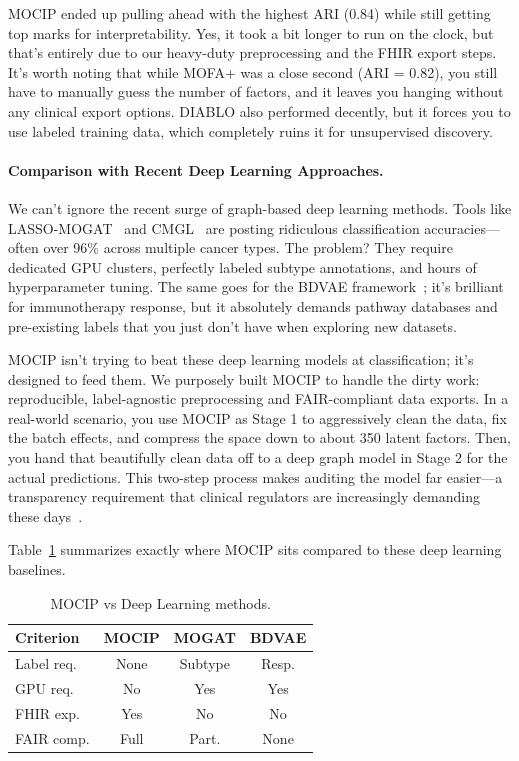\documentclass[12pt,a4paper,onecolumn]{article}
\begin{document}
MOCIP ended up pulling ahead with the highest ARI (0.84) while still getting top marks for interpretability. Yes, it took a bit longer to run on the clock, but that's entirely due to our heavy-duty preprocessing and the FHIR export steps. It's worth noting that while MOFA+ was a close second (ARI = 0.82), you still have to manually guess the number of factors, and it leaves you hanging without any clinical export options. DIABLO also performed decently, but it forces you to use labeled training data, which completely ruins it for unsupervised discovery.

\paragraph{Comparison with Recent Deep Learning Approaches.}
We can't ignore the recent surge of graph-based deep learning methods. Tools like LASSO-MOGAT~\cite{alharbi2024lassomogat} and CMGL~\cite{fan2026cmgl} are posting ridiculous classification accuracies---often over 96\% across multiple cancer types. The problem? They require dedicated GPU clusters, perfectly labeled subtype annotations, and hours of hyperparameter tuning. The same goes for the BDVAE framework~\cite{tariq2025bdvae}; it's brilliant for immunotherapy response, but it absolutely demands pathway databases and pre-existing labels that you just don't have when exploring new datasets.

MOCIP isn't trying to beat these deep learning models at classification; it's designed to feed them. We purposely built MOCIP to handle the dirty work: reproducible, label-agnostic preprocessing and FAIR-compliant data exports. In a real-world scenario, you use MOCIP as Stage 1 to aggressively clean the data, fix the batch effects, and compress the space down to about 350 latent factors. Then, you hand that beautifully clean data off to a deep graph model in Stage 2 for the actual predictions. This two-step process makes auditing the model far easier---a transparency requirement that clinical regulators are increasingly demanding these days~\cite{muneer2025review}.

Table~\ref{tab:comparison_dl} summarizes exactly where MOCIP sits compared to these deep learning baselines.

\begin{table}[H]
\caption{MOCIP vs Deep Learning methods.}\label{tab:comparison_dl}
\centering
\scriptsize
\setlength{\tabcolsep}{2pt}
\begin{tabular}{l c c c}
\toprule
\textbf{Criterion} & \textbf{MOCIP} & \textbf{MOGAT} & \textbf{BDVAE} \\
\midrule
Label req.  & None  & Subtype & Resp. \\
GPU req.    & No    & Yes     & Yes \\
FHIR exp.   & Yes   & No      & No \\
FAIR comp.  & Full  & Part.   & None \\
\bottomrule
\end{tabular}
\end{table}
\end{document}
